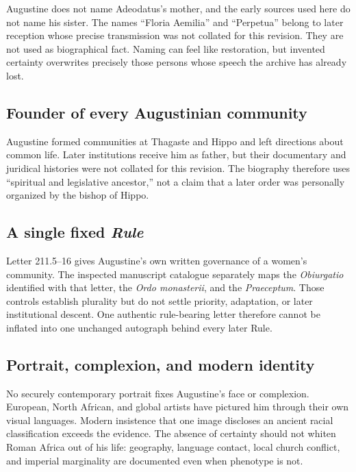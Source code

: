 Augustine does not name Adeodatus's mother, and the early sources used here do
not name his sister. The names “Floria Aemilia” and “Perpetua” belong to later
reception whose precise transmission was not collated for this revision. They
are not used as biographical fact. Naming can feel like restoration, but
invented certainty overwrites precisely those persons whose speech the archive
has already lost.

\subsection{Founder of every Augustinian community}

Augustine formed communities at Thagaste and Hippo and left directions about
common life. Later institutions receive him as father, but their documentary
and juridical histories were not collated for this revision. The biography
therefore uses “spiritual and legislative ancestor,” not a claim that a later
order was personally organized by the bishop of Hippo.

\subsection{A single fixed \emph{Rule}}

Letter 211.5--16 gives Augustine's own written governance of a women's
community. The inspected manuscript catalogue separately maps the
\emph{Obiurgatio} identified with that letter, the \emph{Ordo monasterii}, and
the \emph{Praeceptum}. Those controls establish plurality but do not settle
priority, adaptation, or later institutional descent. One authentic
rule-bearing letter therefore cannot be inflated into one unchanged autograph
behind every later Rule.

\subsection{Portrait, complexion, and modern identity}

No securely contemporary portrait fixes Augustine's face or complexion.
European, North African, and global artists have pictured him through their
own visual languages. Modern insistence that one image discloses an ancient
racial classification exceeds the evidence. The absence of certainty should
not whiten Roman Africa out of his life: geography, language contact, local
church conflict, and imperial marginality are documented even when phenotype
is not.

